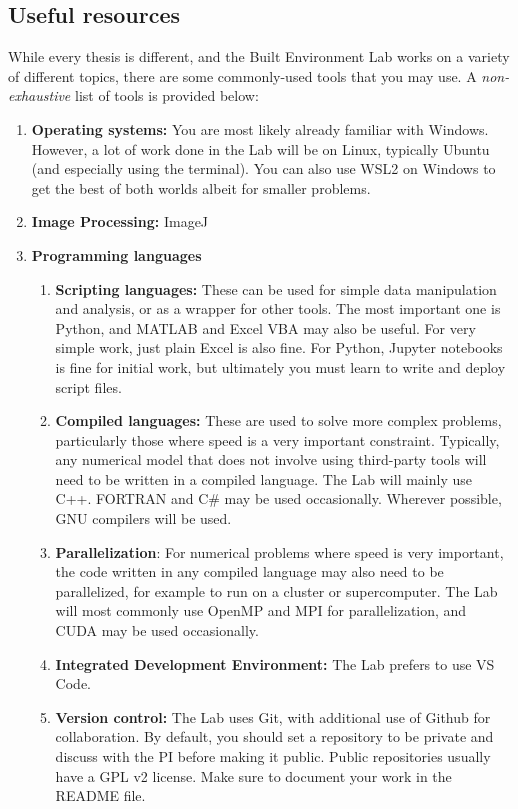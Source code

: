 \documentclass[12pt]{article}
\begin{document}
\subsection{Useful resources}
While every thesis is different, and the Built Environment Lab works on a variety of different topics, there are some commonly-used tools that you may use. A \textit{non-exhaustive} list of tools is provided below:

\begin{enumerate}
	\item \textbf{Operating systems:} You are most likely already familiar with Windows. However, a lot of work done in the Lab will be on Linux, typically Ubuntu (and especially using the terminal). You can also use WSL2 on Windows to get the best of both worlds albeit for smaller problems.
	\item \textbf{Image Processing:} ImageJ
	\item \textbf{Programming languages}
	\begin{enumerate}
		\item \textbf{Scripting languages:} These can be used for simple data manipulation and analysis, or as a wrapper for other tools. The most important one is Python, and MATLAB and Excel VBA may also be useful. For very simple work, just plain Excel is also fine. For Python, Jupyter notebooks is fine for initial work, but ultimately you must learn to write and deploy script files.
		\item \textbf{Compiled languages:} These are used to solve more complex problems, particularly those where speed is a very important constraint. Typically, any numerical model that does not involve using third-party tools will need to be written in a compiled language. The Lab will mainly use C++. FORTRAN and C\# may be used occasionally. Wherever possible, GNU compilers will be used.
		\item \textbf{Parallelization}: For numerical problems where speed is very important, the code written in any compiled language may also need to be parallelized, for example to run on a cluster or supercomputer. The Lab will most commonly use OpenMP and MPI for parallelization, and CUDA may be used occasionally. 
		\item \textbf{Integrated Development Environment:} The Lab prefers to use VS Code.
		\item \textbf{Version control:} The Lab uses Git, with additional use of Github for collaboration. By default, you should set a repository to be private and discuss with the PI before making it public. Public repositories usually have a GPL v2 license. Make sure to document your work in the README file.

\end{enumerate}
\end{enumerate}
\end{document}
